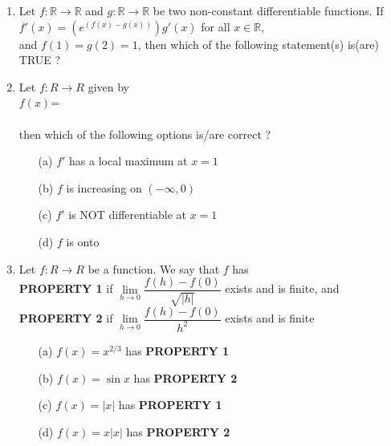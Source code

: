 \documentclass[journal,12pt,twocolumn]{IEEEtran}
\begin{document}
\begin{enumerate}
\item Let $f:\mathbb{R} \to \mathbb{R}$ and $g:\mathbb{R} \to \mathbb{R}$ be two non-constant differentiable functions. If\\
$f'(x)=\left(e^{(f(x)-g(x))}\right)g'(x)$ for all $x \in \mathbb{R}$,
\\ and $f(1)=g(2)=1$, then which of the following statement(s) is(are) TRUE ?
\begin{itemize}
\end{itemize}

\item Let $f:R \to R$ given by\\ $f(x)$= \\ \\then which of the following options is/are correct ?
\begin{itemize}
\item[(a)] $f'$ has a local maximum at $x=1$
\item[(b)] $f$ is increasing on $(-\infty,0)$
\item[(c)] $f'$ is NOT differentiable at $x=1$
\item[(d)] $f$ is onto
\end{itemize}

\item Let $f:R \to R$ be a function. We say that $f$ has \\
\textbf{PROPERTY 1} if $\lim\limits_{h \to 0}\dfrac{f(h)-f(0)}{\sqrt{|h|}}$ exists and is finite, and \\
\textbf{PROPERTY 2} if $\lim\limits_{h \to 0}\dfrac{f(h)-f(0)}{h^2}$ exists and is finite\\
\begin{itemize}
\item[(a)] $f(x)=x^{2/3}$ has \textbf{PROPERTY 1}
\item[(b)] $f(x)=\sin x$ has \textbf{PROPERTY 2}
\item[(c)] $f(x)=|x|$ has \textbf{PROPERTY 1}
\item[(d)] $f(x)=x|x|$ has \textbf{PROPERTY 2}
\end{itemize} \item[~]


\end{enumerate}
\end{document}
